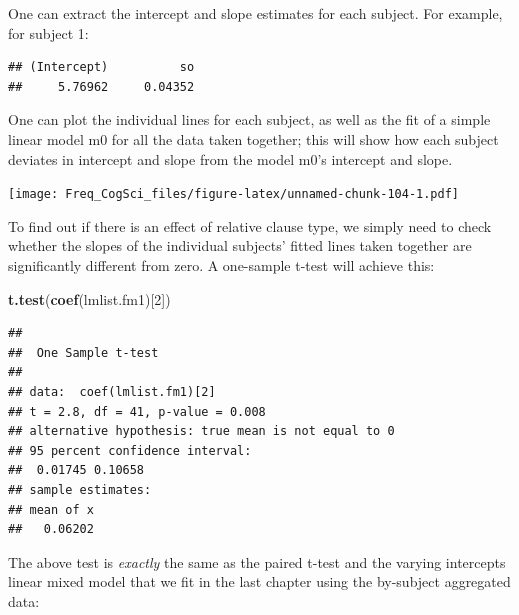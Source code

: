 \documentclass[12pt,]{krantz}
\newenvironment{Shaded}{\begin{snugshade}}{\end{snugshade}}
\newcommand{\DataTypeTok}[1]{\textcolor[rgb]{0.13,0.29,0.53}{#1}}
\newcommand{\DecValTok}[1]{\textcolor[rgb]{0.00,0.00,0.81}{#1}}
\newcommand{\KeywordTok}[1]{\textcolor[rgb]{0.13,0.29,0.53}{\textbf{#1}}}
\newcommand{\NormalTok}[1]{#1}
\newcommand{\OperatorTok}[1]{\textcolor[rgb]{0.81,0.36,0.00}{\textbf{#1}}}
\newcommand{\OtherTok}[1]{\textcolor[rgb]{0.56,0.35,0.01}{#1}}
\newcommand{\StringTok}[1]{\textcolor[rgb]{0.31,0.60,0.02}{#1}}
\begin{document}
One can extract the intercept and slope estimates for each subject. For example, for subject 1:

\begin{Shaded}
\end{Shaded}

\begin{verbatim}
## (Intercept)          so 
##     5.76962     0.04352
\end{verbatim}

One can plot the individual lines for each subject, as well as the fit of a simple linear model m0 for all the data taken together; this will show how each subject deviates in intercept and slope from the model m0's intercept and slope.

\texttt{[image: Freq\_CogSci\_files/figure-latex/unnamed-chunk-104-1.pdf]}

To find out if there is an effect of relative clause type, we simply need to check whether the slopes of the individual subjects' fitted lines taken together are significantly different from zero. A one-sample t-test will achieve this:

\begin{Shaded}
\begin{Highlighting}[]
\KeywordTok{t.test}\NormalTok{(}\KeywordTok{coef}\NormalTok{(lmlist.fm1)[}\DecValTok{2}\NormalTok{])}
\end{Highlighting}
\end{Shaded}

\begin{verbatim}
## 
## 	One Sample t-test
## 
## data:  coef(lmlist.fm1)[2]
## t = 2.8, df = 41, p-value = 0.008
## alternative hypothesis: true mean is not equal to 0
## 95 percent confidence interval:
##  0.01745 0.10658
## sample estimates:
## mean of x 
##   0.06202
\end{verbatim}

The above test is \emph{exactly} the same as the paired t-test and the varying intercepts linear mixed model that we fit in the last chapter using the by-subject aggregated data:

\begin{Shaded}
\end{Shaded}
\end{document}
